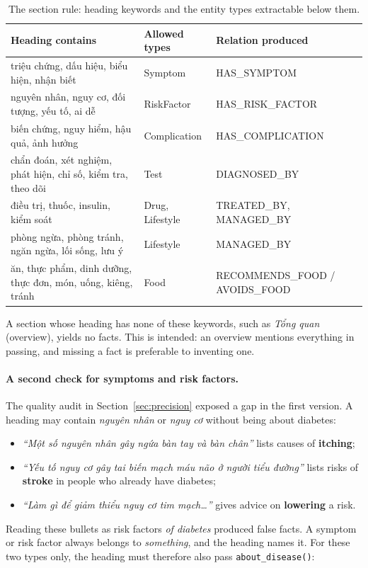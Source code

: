\documentclass[11pt, a4paper]{article}
\newcommand{\code}[1]{\texttt{#1}}
\begin{document}
\begin{table}[H]
\centering
\small
\caption{The section rule: heading keywords and the entity types extractable below them.}
\label{tab:section-rule}
\begin{tabularx}{\textwidth}{X l l}
\toprule
Heading contains & Allowed types & Relation produced \\
\midrule
triệu chứng, dấu hiệu, biểu hiện, nhận biết & Symptom & HAS\_SYMPTOM \\
nguyên nhân, nguy cơ, đối tượng, yếu tố, ai dễ & RiskFactor & HAS\_RISK\_FACTOR \\
biến chứng, nguy hiểm, hậu quả, ảnh hưởng & Complication & HAS\_COMPLICATION \\
chẩn đoán, xét nghiệm, phát hiện, chỉ số, kiểm tra, theo dõi & Test & DIAGNOSED\_BY \\
điều trị, thuốc, insulin, kiểm soát & Drug, Lifestyle & TREATED\_BY, MANAGED\_BY \\
phòng ngừa, phòng tránh, ngăn ngừa, lối sống, lưu ý & Lifestyle & MANAGED\_BY \\
ăn, thực phẩm, dinh dưỡng, thực đơn, món, uống, kiêng, tránh & Food & RECOMMENDS\_FOOD / AVOIDS\_FOOD \\
\bottomrule
\end{tabularx}
\end{table}

A section whose heading has none of these keywords, such as \emph{Tổng quan} (overview), yields no facts. This is intended: an overview mentions everything in passing, and missing a fact is preferable to inventing one.

\paragraph{A second check for symptoms and risk factors.} The quality audit in Section~\ref{sec:precision} exposed a gap in the first version. A heading may contain \emph{nguyên nhân} or \emph{nguy cơ} without being about diabetes:
\begin{itemize}
    \item \emph{``Một số nguyên nhân gây ngứa bàn tay và bàn chân''} lists causes of \textbf{itching};
    \item \emph{``Yếu tố nguy cơ gây tai biến mạch máu não ở người tiểu đường''} lists risks of \textbf{stroke} in people who already have diabetes;
    \item \emph{``Làm gì để giảm thiểu nguy cơ tim mạch\ldots''} gives advice on \textbf{lowering} a risk.
\end{itemize}
Reading these bullets as risk factors \emph{of diabetes} produced false facts. A symptom or risk factor always belongs to \emph{something}, and the heading names it. For these two types only, the heading must therefore also pass \code{about\_disease()}:
\end{document}
